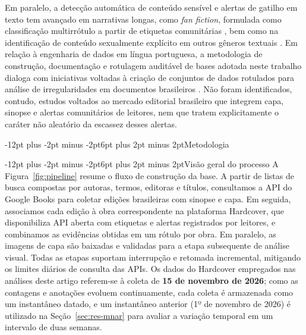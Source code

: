 \documentclass[12pt]{article}
\makeatletter
\renewcommand{\section}{\@startsection{section}{1}{\z@}%
  {-12pt plus -2pt minus -2pt}{6pt plus 2pt minus 2pt}{\normalfont\large\bfseries}}
\renewcommand{\subsection}{\@startsection{subsection}{2}{\z@}%
  {-12pt plus -2pt minus -2pt}{6pt plus 2pt minus 2pt}{\normalfont\normalsize\bfseries}}
\makeatother
\begin{document}
Em paralelo, a detecção automática de conteúdo sensível e alertas de gatilho em texto tem avançado em narrativas longas, como \emph{fan fiction}, formulada como classificação multirrótulo a partir de etiquetas comunitárias \cite{wiegmann2023multilabel,wolska2023trigger,sahin2023arcnlp}, bem como na identificação de conteúdo sexualmente explícito em outros gêneros textuais \cite{zamacola2026spanishlyrics}. Em relação à engenharia de dados em língua portuguesa, a metodologia de construção, documentação e rotulagem auditável de bases adotada neste trabalho dialoga com iniciativas voltadas à criação de conjuntos de dados rotulados para análise de irregularidades em documentos brasileiros \cite{silva2024lipset}. Não foram identificados, contudo, estudos voltados ao mercado editorial brasileiro que integrem capa, sinopse e alertas comunitários de leitores, nem que tratem explicitamente o caráter não aleatório da escassez desses alertas.

\section{Metodologia}
\label{sec:metodo}

\subsection{Visão geral do processo}
A Figura~\ref{fig:pipeline} resume o fluxo de construção da base. A partir de listas de busca compostas por autoras, termos, editoras e títulos, consultamos a API do Google Books para coletar edições brasileiras com sinopse e capa. Em seguida, associamos cada edição à obra correspondente na plataforma Hardcover, que disponibiliza API aberta com etiquetas e alertas registrados por leitores, e combinamos as evidências obtidas em um rótulo por obra. Em paralelo, as imagens de capa são baixadas e validadas para a etapa subsequente de análise visual. Todas as etapas suportam interrupção e retomada incremental, mitigando os limites diários de consulta das APIs. Os dados do Hardcover empregados nas análises deste artigo referem-se à coleta de \textbf{15 de novembro de 2026}; como as contagens e anotações evoluem continuamente, cada coleta é armazenada como um instantâneo datado, e um instantâneo anterior (1º de novembro de 2026) é utilizado na Seção~\ref{sec:res-mnar} para avaliar a variação temporal em um intervalo de duas semanas.
\end{document}

